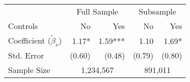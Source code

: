 \documentclass{standalone}
\begin{document}
\begin{tabular}{lrrrr}
\toprule 
\midrule 
  & \multicolumn{2}{c}{Full Sample} & \multicolumn{2}{c}{Subsample} \\
 \cmidrule(lr){2-3} \cmidrule(lr){4-5} 
Controls & No & Yes & No & Yes \\[1.000000pt]
\midrule 
Coefficient ($\tilde{\beta}_\nu$) & 1.17* & 1.59*** & 1.10 & 1.69* \\
Std. Error & (0.60) & (0.48) & (0.79) & (0.80) \\
\midrule 
Sample Size & \multicolumn{2}{c}{1,234,567} & \multicolumn{2}{c}{891,011} \\
\midrule 
\bottomrule 
\end{tabular}
\end{document}

